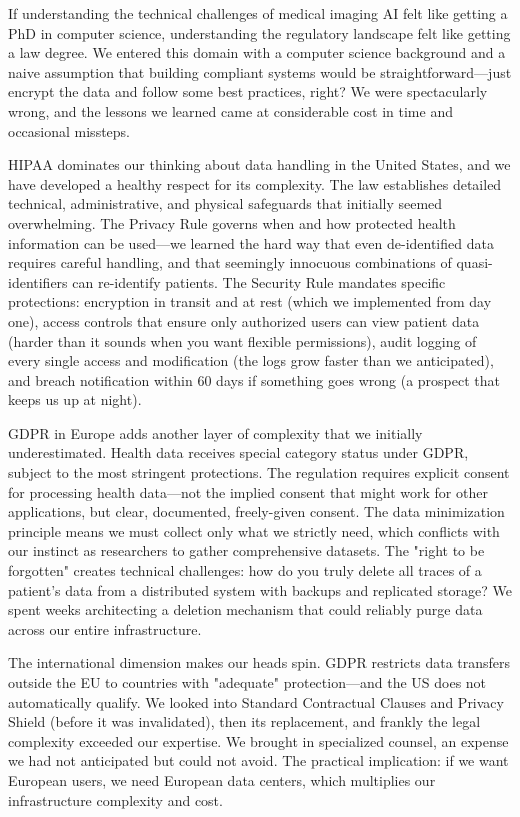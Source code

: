\documentclass[12pt,a4paper]{article}
\begin{document}
If understanding the technical challenges of medical imaging AI felt like getting a PhD in computer science, understanding the regulatory landscape felt like getting a law degree. We entered this domain with a computer science background and a naive assumption that building compliant systems would be straightforward—just encrypt the data and follow some best practices, right? We were spectacularly wrong, and the lessons we learned came at considerable cost in time and occasional missteps.

HIPAA dominates our thinking about data handling in the United States, and we have developed a healthy respect for its complexity. The law establishes detailed technical, administrative, and physical safeguards that initially seemed overwhelming. The Privacy Rule governs when and how protected health information can be used—we learned the hard way that even de-identified data requires careful handling, and that seemingly innocuous combinations of quasi-identifiers can re-identify patients. The Security Rule mandates specific protections: encryption in transit and at rest (which we implemented from day one), access controls that ensure only authorized users can view patient data (harder than it sounds when you want flexible permissions), audit logging of every single access and modification (the logs grow faster than we anticipated), and breach notification within 60 days if something goes wrong (a prospect that keeps us up at night).

GDPR in Europe adds another layer of complexity that we initially underestimated. Health data receives special category status under GDPR, subject to the most stringent protections. The regulation requires explicit consent for processing health data—not the implied consent that might work for other applications, but clear, documented, freely-given consent. The data minimization principle means we must collect only what we strictly need, which conflicts with our instinct as researchers to gather comprehensive datasets. The "right to be forgotten" creates technical challenges: how do you truly delete all traces of a patient's data from a distributed system with backups and replicated storage? We spent weeks architecting a deletion mechanism that could reliably purge data across our entire infrastructure.

The international dimension makes our heads spin. GDPR restricts data transfers outside the EU to countries with "adequate" protection—and the US does not automatically qualify. We looked into Standard Contractual Clauses and Privacy Shield (before it was invalidated), then its replacement, and frankly the legal complexity exceeded our expertise. We brought in specialized counsel, an expense we had not anticipated but could not avoid. The practical implication: if we want European users, we need European data centers, which multiplies our infrastructure complexity and cost.
\end{document}
